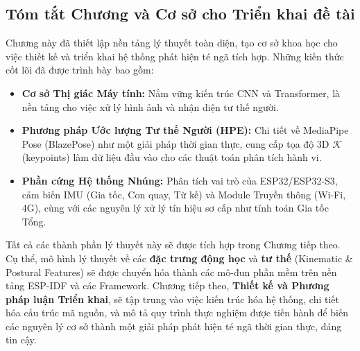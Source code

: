 \subsection{Tóm tắt Chương và Cơ sở cho Triển khai đề tài}
\label{sec:chapter_conclusion}

Chương này đã thiết lập nền tảng lý thuyết toàn diện, tạo cơ sở khoa học cho việc thiết kế và triển khai hệ thống phát hiện té ngã tích hợp. Những kiến thức cốt lõi đã được trình bày bao gồm:
\begin{itemize}
    \item \textbf{Cơ sở Thị giác Máy tính:} Nắm vững kiến trúc CNN và Transformer, là nền tảng cho việc xử lý hình ảnh và nhận diện tư thế người.
    \item \textbf{Phương pháp Ước lượng Tư thế Người (HPE):} Chi tiết về MediaPipe Pose (BlazePose) như một giải pháp thời gian thực, cung cấp tọa độ 3D $\mathcal{K}$ (keypoints) làm dữ liệu đầu vào cho các thuật toán phân tích hành vi.
    \item \textbf{Phần cứng Hệ thống Nhúng:} Phân tích vai trò của ESP32/ESP32-S3, cảm biến IMU (Gia tốc, Con quay, Từ kế) và Module Truyền thông (Wi-Fi, 4G), cùng với các nguyên lý xử lý tín hiệu sơ cấp như tính toán Gia tốc Tổng.
\end{itemize}

Tất cả các thành phần lý thuyết này sẽ được tích hợp trong Chương tiếp theo. Cụ thể, mô hình lý thuyết về các \textbf{đặc trưng động học} và \textbf{tư thế} (Kinematic \& Postural Features) sẽ được chuyển hóa thành các mô-đun phần mềm trên nền tảng ESP-IDF và các Framework. Chương tiếp theo, \textbf{Thiết kế và Phương pháp luận Triển khai}, sẽ tập trung vào việc kiến trúc hóa hệ thống, chi tiết hóa cấu trúc mã nguồn, và mô tả quy trình thực nghiệm được tiến hành để biến các nguyên lý cơ sở thành một giải pháp phát hiện té ngã thời gian thực, đáng tin cậy.
